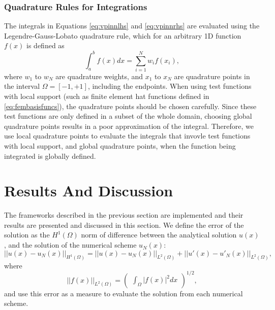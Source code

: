 \subsubsection{Quadrature Rules for Integrations}\label{sec:quadraturerules}
The integrals in Equations \ref{eq:vpinnlhs} and \ref{eq:vpinnrhs} are evaluated using the Legendre-Gauss-Lobato quadrature rule, which for an arbitrary 1D function $f(x)$ is defined as
\begin{equation}
    \label{eq:quadrature}
    \int_a^bf(x)dx = \sum_{i=1}^N{w_if(x_i)},
\end{equation}
where $w_1$ to $w_N$ are quadrature weights, and $x_1$ to $x_N$ are quadrature points in the interval $\Omega = [-1, +1]$, including the endpoints. When using test functions with local support (such as finite element hat functions defined in \autoref{eq:fembasisfuncs}), the quadrature points should be chosen carefully. Since these test functions are only defined in a subset of the whole domain, choosing global quadrature points results in a poor approximation of the integral. Therefore, we use local quadrature points to evaluate the integrals that invovle test functions with local support, and global quadrature points, when the function being integrated is globally defined.

\section{Results And Discussion}\label{sec:results}
The frameworks described in the previous section are implemented and their results are presented and discussed in this section. We define the error of the solution as the $H^1{(\Omega)}$ norm of difference between the analytical solution $u(x)$, and the solution of the numerical scheme $u_N(x)$:
\begin{equation}
    \label{eq:H1error}
    ||u(x) - u_N(x)||_{H^1{(\Omega)}} = ||u(x) - u_N(x)||_{L^2{(\Omega)}} + ||u'(x) - u'_N(x)||_{L^2{(\Omega)}},
\end{equation}
where
\begin{equation}
    \label{eq:L2error}
    ||f(x)||_{L^2{(\Omega)}} = \begin{pmatrix} \int_{\Omega}{|f(x)|^2dx} \end{pmatrix}^{1/2},
\end{equation}
and use this error as a measure to evaluate the solution from each numerical scheme.

